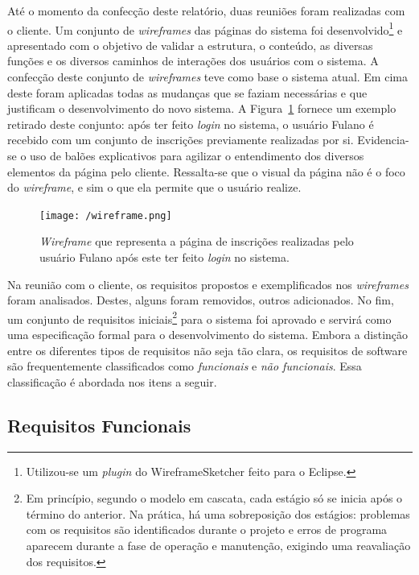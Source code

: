 \documentclass[
  10.5pt,				  %
	openright,			%
	twoside,			  %
  a5paper,
  chapter=TITLE,	%
	section=TITLE,	%
  hyphens,        %
	english,        %
	brazil          %
]{abntex2}
\begin{document}
Até o momento da confecção deste relatório, duas reuniões foram realizadas com o cliente. Um conjunto de \emph{wireframes} das páginas do sistema foi desenvolvido\footnote{Utilizou-se um \emph{plugin} do WireframeSketcher feito para o Eclipse.} e apresentado com o objetivo de validar a estrutura, o conteúdo, as diversas funções e os diversos caminhos de interações dos usuários com o sistema. A confecção deste conjunto de \emph{wireframes} teve como base o sistema atual. Em cima deste foram aplicadas todas as mudanças que se faziam necessárias e que justificam o desenvolvimento do novo sistema. A Figura~\ref{fig:wireframe} fornece um exemplo retirado deste conjunto: após ter feito \emph{login} no sistema, o usuário Fulano é recebido com um conjunto de inscrições previamente realizadas por si. Evidencia-se o uso de balões explicativos para agilizar o entendimento dos diversos elementos da página pelo cliente. Ressalta-se que o visual da página não é o foco do \emph{wireframe}, e sim o que ela permite que o usuário realize.

\begin{figure}[!ht]
  \caption{\label{fig:wireframe} \emph{Wireframe} que representa a página de inscrições realizadas pelo usuário Fulano após este ter feito \emph{login} no sistema. }
  \begin{center}
    \texttt{[image: /wireframe.png]}
  \end{center}
\end{figure}

Na reunião com o cliente, os requisitos propostos e exemplificados nos \emph{wireframes} foram analisados. Destes, alguns foram removidos, outros adicionados. No fim, um conjunto de requisitos iniciais\footnote{Em princípio, segundo o modelo em cascata, cada estágio só se inicia após o término do anterior. Na prática, há uma sobreposição dos estágios: problemas com os requisitos são identificados durante o projeto e erros de programa aparecem durante a fase de operação e manutenção, exigindo uma reavaliação dos requisitos.} para o sistema foi aprovado e servirá como uma especificação formal para o desenvolvimento do sistema. Embora a distinção entre os diferentes tipos de requisitos não seja tão clara, os requisitos de software são frequentemente classificados como \emph{funcionais} e \emph{não funcionais}. Essa classificação é abordada nos itens a seguir.

\subsection{Requisitos Funcionais}\label{sec:requisitos_funcionais}
\end{document}
